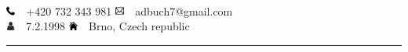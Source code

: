 \documentclass[a4paper,11pt]{article}
\begin{document}
\begin{paracol}{2}
\begin{leftcolumn}
\begin{flushright}
        \end{flushright}

    \end{leftcolumn}

    \begin{rightcolumn}

        \vspace*{1pt}
         \vspace{0.5cm} \\
        \hspace*{0.5cm} \includegraphics[width=0.3cm]{phone.png}~~+420 732 343 981 \hfill \includegraphics[width=0.3cm]{email.png}~~adbuch7@gmail.com \hspace*{2cm} \vspace{0.4cm} \\
        \hspace*{0.5cm} \includegraphics[width=0.3cm]{person.png}~~7.2.1998 \hfill \includegraphics[width=0.3cm]{house.png}~~Brno, Czech republic   \hspace*{2cm} \vspace{8pt} \\
        \rule{\linewidth}{0.5pt}

        \vspace{32pt}
        \begin{parcolumns}[colwidths={1=0.3\textwidth}]{2}
        \end{parcolumns}

        \vspace{5pt}
        \begin{parcolumns}[colwidths={1=0.3\textwidth}]{2}
        \end{parcolumns}




\end{rightcolumn}
\end{paracol}
\end{document}
